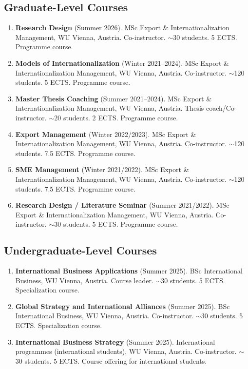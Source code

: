 \documentclass[11pt,a4paper]{article}
\begin{document}
\begin{cv}
\subsection{Graduate-Level Courses}
\begin{enumerate}
    \item \textbf{Research Design} (Summer 2026). MSc Export \& Internationalization Management, WU Vienna, Austria. Co-instructor. $\sim$30 students. 5 ECTS. Programme course.
    \item \textbf{Models of Internationalization} (Winter 2021--2024). MSc Export \& Internationalization Management, WU Vienna, Austria. Co-instructor. $\sim$120 students. 5 ECTS. Programme course.
    \item \textbf{Master Thesis Coaching} (Summer 2021--2024). MSc Export \& Internationalization Management, WU Vienna, Austria. Thesis coach/Co-instructor. $\sim$20 students. 2 ECTS. Programme course.
    \item \textbf{Export Management} (Winter 2022/2023). MSc Export \& Internationalization Management, WU Vienna, Austria. Co-instructor. $\sim$120 students. 7.5 ECTS. Programme course.
    \item \textbf{SME Management} (Winter 2021/2022). MSc Export \& Internationalization Management, WU Vienna, Austria. Co-instructor. $\sim$120 students. 7.5 ECTS. Programme course.
    \item \textbf{Research Design / Literature Seminar} (Summer 2021/2022). MSc Export \& Internationalization Management, WU Vienna, Austria. Co-instructor. $\sim$30 students. 5 ECTS. Programme course.
\end{enumerate}
 
\subsection{Undergraduate-Level Courses}
\begin{enumerate}
    \item \textbf{International Business Applications} (Summer 2025). BSc International Business, WU Vienna, Austria. Course leader. $\sim$30 students. 5 ECTS. Specialization course.
    \item \textbf{Global Strategy and International Alliances} (Summer 2025). BSc International Business, WU Vienna, Austria. Co-instructor. $\sim$30 students. 5 ECTS. Specialization course.
    \item \textbf{International Business Strategy} (Summer 2025). International programmes (international students), WU Vienna, Austria. Co-instructor. $\sim$30 students. 5 ECTS. Course offering for international students.
\end{enumerate}


\end{cv}
\end{document}
